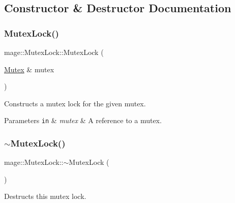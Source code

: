 \subsection{Constructor \& Destructor Documentation}
\hypertarget{structmage_1_1_mutex_lock_aa8cd93677eec2656ca217fdf79f911c4}{}\label{structmage_1_1_mutex_lock_aa8cd93677eec2656ca217fdf79f911c4} 
\subsubsection{\texorpdfstring{Mutex\+Lock()}{MutexLock()}\hspace{0.1cm}{\footnotesize\ttfamily [1/2]}}
{\footnotesize\ttfamily mage\+::\+Mutex\+Lock\+::\+Mutex\+Lock (\begin{DoxyParamCaption}\item[{\hyperlink{classmage_1_1_mutex}{Mutex} \&}]{mutex }\end{DoxyParamCaption})}

Constructs a mutex lock for the given mutex.


\begin{DoxyParams}[1]{Parameters}
\mbox{\tt in}  & {\em mutex} & A reference to a mutex. \\
\hline
\end{DoxyParams}
\hypertarget{structmage_1_1_mutex_lock_a2631e8878646b2d25b136b6adb55d553}{}\label{structmage_1_1_mutex_lock_a2631e8878646b2d25b136b6adb55d553} 
\subsubsection{\texorpdfstring{$\sim$\+Mutex\+Lock()}{~MutexLock()}}
{\footnotesize\ttfamily mage\+::\+Mutex\+Lock\+::$\sim$\+Mutex\+Lock (\begin{DoxyParamCaption}{ }\end{DoxyParamCaption})}

Destructs this mutex lock. \hypertarget{structmage_1_1_mutex_lock_a20b0f44c31bcb2040cbf23f071870af9}{}\label{structmage_1_1_mutex_lock_a20b0f44c31bcb2040cbf23f071870af9} 
